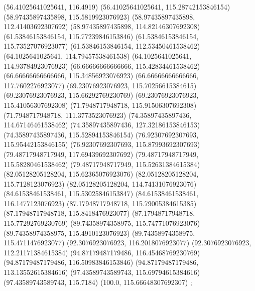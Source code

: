 {{{		(56.41025641025641, 116.4919)
		(56.41025641025641, 115.28742153846154)
		(58.97435897435898, 115.5819923076923)
		(58.97435897435898, 112.41403692307692)
		(58.97435897435898, 114.82146307692308)
		(61.53846153846154, 115.77239846153846)
		(61.53846153846154, 115.73527076923077)
		(61.53846153846154, 112.53450461538462)
		(64.1025641025641, 114.79457538461538)
		(64.1025641025641, 114.93784923076923)
		(66.66666666666666, 115.42834461538462)
		(66.66666666666666, 115.34856923076923)
		(66.66666666666666, 117.7602276923077)
		(69.23076923076923, 115.70256615384615)
		(69.23076923076923, 115.66292769230769)
		(69.23076923076923, 115.41056307692308)
		(71.7948717948718, 115.91506307692308)
		(71.7948717948718, 111.3773523076923)
		(74.35897435897436, 114.67146461538462)
		(74.35897435897436, 127.32186153846153)
		(74.35897435897436, 115.52894153846154)
		(76.92307692307693, 115.95442153846155)
		(76.92307692307693, 115.87993692307693)
		(79.48717948717949, 117.69439692307692)
		(79.48717948717949, 115.58280461538462)
		(79.48717948717949, 115.52631384615384)
		(82.05128205128204, 115.62365076923076)
		(82.05128205128204, 115.7128123076923)
		(82.05128205128204, 114.74131076923076)
		(84.61538461538461, 115.53025846153847)
		(84.61538461538461, 116.1477123076923)
		(87.17948717948718, 115.79005384615385)
		(87.17948717948718, 115.8418476923077)
		(87.17948717948718, 115.77292769230769)
		(89.74358974358975, 115.74771076923076)
		(89.74358974358975, 115.4910123076923)
		(89.74358974358975, 115.4711476923077)
		(92.3076923076923, 116.2018076923077)
		(92.3076923076923, 112.21171384615384)
		(94.87179487179486, 116.45468769230769)
		(94.87179487179486, 116.50983846153846)
		(94.87179487179486, 113.13552615384616)
		(97.43589743589743, 115.69794615384616)
		(97.43589743589743, 115.7184)
		(100.0, 115.66648307692307)
	};

}}
